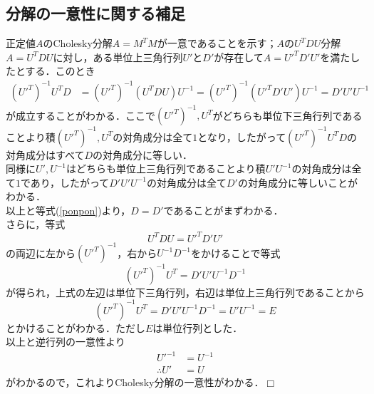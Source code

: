 \documentclass{jsarticle}
\theoremstyle{definition}
\theoremstyle{mystyle} %
\def\qed{\hfill$\Box$}
\begin{document}
\subsection*{\Large 分解の一意性に関する補足}
正定値$A$のCholesky分解$A=M^TM$が一意であることを示す；$A$の$U^TDU$分解$A=U^TDU$に対し，ある単位上三角行列$U'$と$D'$が存在して$A={U'}^TD'U'$を満たしたとする．このとき
\begin{align}
\label{ponpon}
({U'}^T)^{-1}{U^T}D&=({U'}^T)^{-1}(U^TDU)U^{-1}=({U'}^T)^{-1}({U'}^TD'U')U^{-1}=D'U'U^{-1}
\end{align}
が成立することがわかる．ここで$({U'}^T)^{-1},U^T$がどちらも単位下三角行列であることより積$({U'}^T)^{-1},U^T$の対角成分は全て$1$となり，したがって$({U'}^T)^{-1}{U^T}D$の対角成分はすべて$D$の対角成分に等しい．\\
同様に$U',U^{-1}$はどちらも単位上三角行列であることより積$U'U^{-1}$の対角成分は全て$1$であり，したがって$D'U'U^{-1}$の対角成分は全て$D'$の対角成分に等しいことがわかる．\\

以上と等式(\ref{ponpon})より，$D=D'$であることがまずわかる．\\


さらに，等式
$$U^TDU={U'}^TD'U'$$
の両辺に左から$({U'}^T)^{-1}$，右から$U^{-1}D^{-1}$をかけることで等式
$$({U'}^T)^{-1}U^T=D'U'U^{-1}D^{-1}$$
が得られ，上式の左辺は単位下三角行列，右辺は単位上三角行列であることから
$$({U'}^T)^{-1}U^T=D'U'U^{-1}D^{-1}=U'U^{-1}=E$$
とかけることがわかる．ただし$E$は単位行列とした．\\

以上と逆行列の一意性より
\begin{align*}
 {U'}^{-1}&=U^{-1}\\
\therefore U'&=U
\end{align*}
がわかるので，これよりCholesky分解の一意性がわかる．\qed
\end{document}
